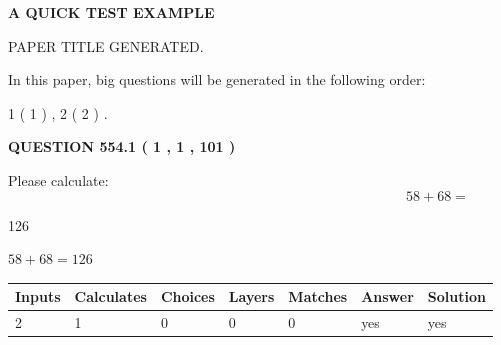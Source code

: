 \documentclass[12pt]{article}
\begin{document}
   
\vspace{0.2in}
   
   
   
   
   
   
   
   
 \vspace{0.2in}
{\LARGE {\textbf{ A QUICK TEST EXAMPLE}}}
   
   
 PAPER TITLE GENERATED.
   
   
   
\vspace{0.2in}
   
In this paper, big questions will be generated in the following order: 
   
   
   1 ( 1 )
 ,
   2 ( 2 )
 .
  
\vspace{0.2in}
  
{\textbf{\Large{QUESTION
554.1 
 ( 1 , 1 , 101 )
}}}
  
  
 
Please calculate:
\begin{equation}
58 +  %
68 = \nonumber
\end{equation}
 
 
 
\noindent{}
 
 

126
 
 
\noindent{}
 
 

 
 
 
\noindent{}
 
 

$ %
58 +  %
68=   %
126$
 
 
\noindent{}
 
 

 
   
   
   
   
\noindent\begin{tabular}{|l|l|l|l|l|l|l|}
 \hline
Inputs & Calculates & Choices & Layers & Matches & Answer & Solution \\ \hline
 2  & 
 1  & 
 0
  & 
 0  & 
 0  & 
  yes & 
  yes 
  \\ \hline
 \end{tabular}
   
\end{document}
